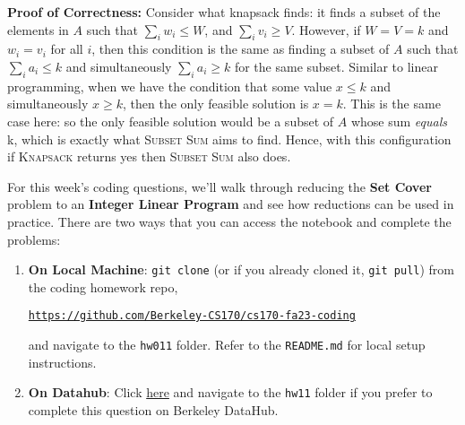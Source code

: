 \documentclass[11pt]{article}
\begin{document}
\begin{subparts}
\begin{solution}
	\textbf{Proof of Correctness:} Consider what knapsack finds: it finds a subset of the elements in 
	\( A \) such that \( \sum_i w_i \le  W \), and \(\sum_i v_i \ge V \). 
	However, if \( W = V = k \) and \( w_i = v_i \) 
	for all \( i \), then this condition is the same as finding a subset of \( A  \) such that 
	\( \sum_i a_i \le  k \) and simultaneously \( \sum_i a_i \ge k \) for the same subset. 
	Similar to linear programming, when we have the condition that some value 
	\( x \le  k \) and simultaneously \( x \ge  k \), then the only feasible solution is 
	\( x = k \). This is the same case here: so the only feasible solution would be a subset of \( A \) whose 
	sum \textit{equals} k, which is exactly what \textsc{Subset Sum} aims to find. Hence, with this configuration 
	if \textsc{Knapsack} returns yes then \textsc{Subset Sum} also does.
\end{solution}
\end{subparts}

\pagebreak
{}

For this week’s coding questions, we'll walk through reducing the \textbf{Set Cover} problem to an \textbf{Integer Linear Program} and see how reductions can be used in practice. There are two ways that you can access the notebook and complete the problems:
\begin{enumerate}
    \item \textbf{On Local Machine}: \texttt{git clone} (or if you already cloned it, \texttt{git pull}) from the coding homework repo, 
    
    \textcolor{blue}{\href{https://github.com/Berkeley-CS170/cs170-fa23-coding}{\texttt{https://github.com/Berkeley-CS170/cs170-fa23-coding}}}
    
    and navigate to the \texttt{hw011} folder. Refer to the \texttt{README.md} for local setup instructions.

    \item \textbf{On Datahub}: Click \textcolor{blue}{\href{https://datahub.berkeley.edu/hub/user-redirect/git-pull?repo=https://github.com/Berkeley-CS170/cs170-fa23-coding}{here}} and navigate to the \texttt{hw11} folder if you prefer to complete this question on Berkeley DataHub.
\end{enumerate}
\end{document}
